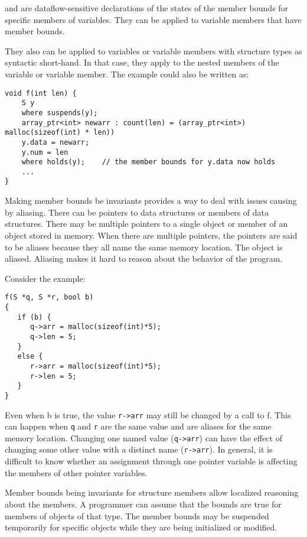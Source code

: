  and  are dataflow-sensitive declarations of 
the states of the member bounds for specific members of variables. They can be
applied to variable members that have member bounds.

They also can be applied to variables or variable members with structure
types as syntactic short-hand. In that case, they apply to the nested
members of the variable or variable member. The example could also be
written as:

\begin{verbatim}
void f(int len) {
    S y 
    where suspends(y);
    array_ptr<int> newarr : count(len) = (array_ptr<int>) malloc(sizeof(int) * len))
    y.data = newarr;
    y.num = len
    where holds(y);    // the member bounds for y.data now holds
    ...
}
\end{verbatim}

Making member bounds be invariants provides a way to deal with issues
causing by aliasing. There can be pointers to data structures or members
of data structures. There may be multiple pointers to a single object or
member of an object stored in memory. When there are multiple pointers,
the pointers are said to be aliases because they all name the same
memory location. The object is aliased. Aliasing makes it hard to reason
about the behavior of the program.

Consider the example:
\begin{verbatim}
f(S *q, S *r, bool b)
{
   if (b) {
      q->arr = malloc(sizeof(int)*5);
      q->len = 5;
   }
   else {
      r->arr = malloc(sizeof(int)*5);
      r->len = 5;
   }
}
\end{verbatim}

Even when b is true, the value \texttt{r->arr} may still be
changed by a call to f. This can happen when \texttt{q} and \texttt{r}
are the same value and are aliases for the same memory location.
Changing one named value (\texttt{q->arr}) can have the
effect of changing some other value with a distinct name
(\texttt{r->arr}). In general, it is difficult to know
whether an assignment through one pointer variable is affecting the
members of other pointer variables.

Member bounds being invariants for structure members allow localized
reasoning about the members. A programmer can assume that the bounds are true
for members of objects of that type. The member bounds may be suspended temporarily
for specific objects while they are being initialized or modified.

